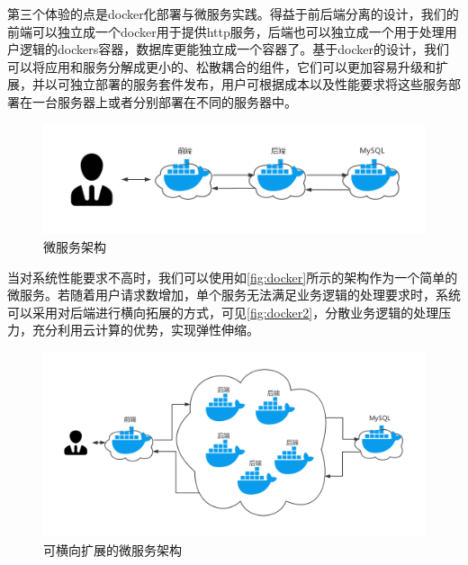 第三个体验的点是docker化部署与微服务实践。得益于前后端分离的设计，我们的前端可以独立成一个docker用于提供http服务，后端也可以独立成一个用于处理用户逻辑的dockers容器，数据库更能独立成一个容器了。基于docker的设计，我们可以将应用和服务分解成更小的、松散耦合的组件，它们可以更加容易升级和扩展，并以可独立部署的服务套件发布，用户可根据成本以及性能要求将这些服务部署在一台服务器上或者分别部署在不同的服务器中。

\begin{figure}[htp]
    \centering
    \includegraphics[width=15cm]{report/figure/appendix2/docker.png}
    \caption{微服务架构}
    \label{fig:docker}
\end{figure}


当对系统性能要求不高时，我们可以使用如\autoref{fig:docker}所示的架构作为一个简单的微服务。若随着用户请求数增加，单个服务无法满足业务逻辑的处理要求时，系统可以采用对后端进行横向拓展的方式，可见\autoref{fig:docker2}，分散业务逻辑的处理压力，充分利用云计算的优势，实现弹性伸缩。


\begin{figure}[htp]
    \centering
    \includegraphics[width=15cm]{report/figure/appendix2/docker2.png}
    \caption{可横向扩展的微服务架构}
    \label{fig:docker2}
\end{figure}


